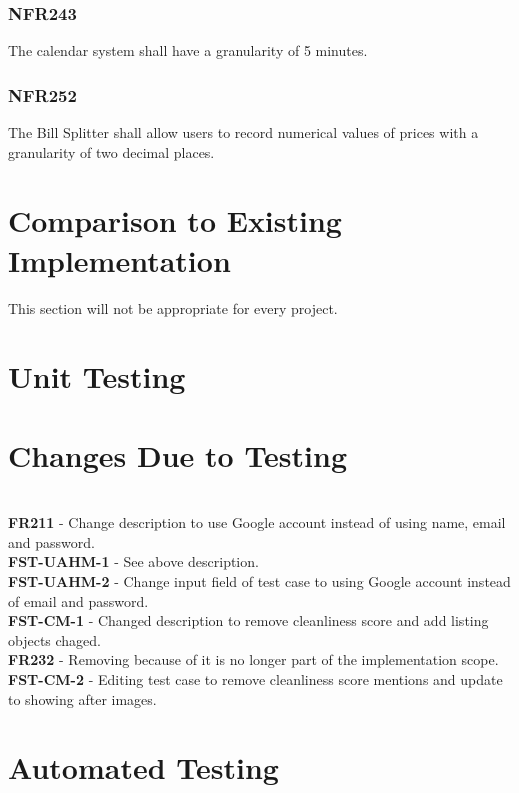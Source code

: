 \documentclass[12pt, titlepage]{article}
\begin{document}
\subsubsection{NFR243}
The calendar system shall have a granularity of 5 minutes.
\subsubsection{NFR252}
The Bill Splitter shall allow users to record numerical values of
prices with a granularity of two decimal places.

\section{Comparison to Existing Implementation}	

This section will not be appropriate for every project.

\section{Unit Testing}

\section{Changes Due to Testing}

\\
\textbf{FR211} - Change description to use Google account instead of using name, email and password.\\
\textbf{FST-UAHM-1} - See above description. \\
\textbf{FST-UAHM-2} - Change input field of test case to using Google account instead of email and password. \\
\textbf{FST-CM-1} - Changed description to remove cleanliness score and add listing objects chaged. \\
\textbf{FR232} - Removing because of it is no longer part of the implementation scope. \\
\textbf{FST-CM-2} - Editing test case to remove cleanliness score mentions and update to showing after images. \\


\section{Automated Testing}
		
\end{document}

